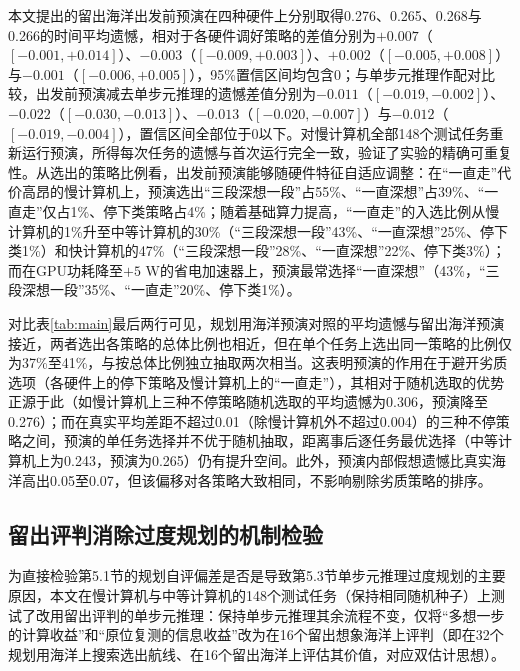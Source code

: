 本文提出的留出海洋出发前预演在四种硬件上分别取得0.276、0.265、0.268与0.266的时间平均遗憾，相对于各硬件调好策略的差值分别为$+0.007$（$[-0.001, +0.014]$）、$-0.003$（$[-0.009, +0.003]$）、$+0.002$（$[-0.005, +0.008]$）与$-0.001$（$[-0.006, +0.005]$），95\%置信区间均包含0；与单步元推理作配对比较，出发前预演减去单步元推理的遗憾差值分别为$-0.011$（$[-0.019, -0.002]$）、$-0.022$（$[-0.030, -0.013]$）、$-0.013$（$[-0.020, -0.007]$）与$-0.012$（$[-0.019, -0.004]$），置信区间全部位于0以下。对慢计算机全部148个测试任务重新运行预演，所得每次任务的遗憾与首次运行完全一致，验证了实验的精确可重复性。从选出的策略比例看，出发前预演能够随硬件特征自适应调整：在“一直走”代价高昂的慢计算机上，预演选出“三段深想一段”占55\%、“一直深想”占39\%、“一直走”仅占1\%、停下类策略占4\%；随着基础算力提高，“一直走”的入选比例从慢计算机的1\%升至中等计算机的30\%（“三段深想一段”43\%、“一直深想”25\%、停下类1\%）和快计算机的47\%（“三段深想一段”28\%、“一直深想”22\%、停下类3\%）；而在GPU功耗降至$+5\text{ W}$的省电加速器上，预演最常选择“一直深想”（43\%，“三段深想一段”35\%、“一直走”20\%、停下类1\%）。

对比表\ref{tab:main}最后两行可见，规划用海洋预演对照的平均遗憾与留出海洋预演接近，两者选出各策略的总体比例也相近，但在单个任务上选出同一策略的比例仅为37\%至41\%，与按总体比例独立抽取两次相当。这表明预演的作用在于避开劣质选项（各硬件上的停下策略及慢计算机上的“一直走”），其相对于随机选取的优势正源于此（如慢计算机上三种不停策略随机选取的平均遗憾为0.306，预演降至0.276）；而在真实平均差距不超过0.01（除慢计算机外不超过0.004）的三种不停策略之间，预演的单任务选择并不优于随机抽取，距离事后逐任务最优选择（中等计算机上为0.243，预演为0.265）仍有提升空间。此外，预演内部假想遗憾比真实海洋高出0.05至0.07，但该偏移对各策略大致相同，不影响剔除劣质策略的排序。

\subsection{留出评判消除过度规划的机制检验}

为直接检验第5.1节的规划自评偏差是否是导致第5.3节单步元推理过度规划的主要原因，本文在慢计算机与中等计算机的148个测试任务（保持相同随机种子）上测试了改用留出评判的单步元推理：保持单步元推理其余流程不变，仅将“多想一步的计算收益”和“原位复测的信息收益”改为在16个留出想象海洋上评判（即在32个规划用海洋上搜索选出航线、在16个留出海洋上评估其价值，对应双估计思想\cite{vanhasselt2010double}）。

